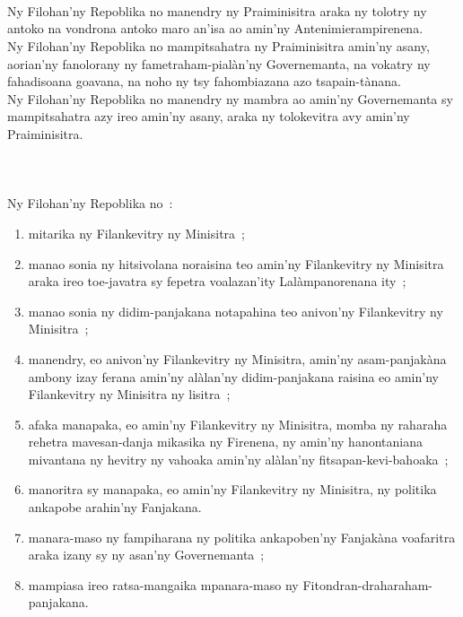 \documentclass[12pt]{article}
\newcounter{laharana}
\newcommand{\andininy}[0]{
  \paragraph{%
    \NoCaseChange{%
      Andininy~\addtocounter{laharana}{1}\thelaharana.}\label{and:\thelaharana}~%
  }%
}
\begin{document}
\andininy{}Ny Filohan'ny Repoblika no manendry ny Praiminisitra araka ny
tolotry ny antoko na vondrona antoko maro an'isa ao amin'ny
Antenimierampirenena.\\

\noindent
Ny Filohan'ny Repoblika no mampitsahatra ny Praiminisitra amin'ny asany,
aorian'ny fanolorany ny fametraham-pialàn'ny Governemanta, na vokatry ny
fahadisoana goavana, na noho ny tsy fahombiazana azo tsapain-tànana.\\

\noindent
Ny Filohan'ny Repoblika no manendry ny mambra ao amin'ny Governemanta sy
mampitsahatra azy ireo amin'ny asany, araka ny tolokevitra avy amin'ny
Praiminisitra.

\andininy{}Ny Filohan'ny Repoblika no~:

\begin{enumerate}
\item mitarika ny Filankevitry ny Minisitra~;

\item manao sonia ny hitsivolana noraisina teo amin'ny Filankevitry ny Minisitra
  araka ireo toe-javatra sy fepetra voalazan'ity Lalàmpanorenana ity~;

\item manao sonia ny didim-panjakana notapahina teo anivon'ny Filankevitry ny
  Minisitra~;

\item manendry, eo anivon'ny Filankevitry ny Minisitra, amin'ny asam-panjakàna
  ambony izay ferana amin'ny alàlan'ny didim-panjakana raisina eo amin'ny
  Filankevitry ny Minisitra ny lisitra~;

\item afaka manapaka, eo amin'ny Filankevitry ny Minisitra, momba ny raharaha
  rehetra mavesan-danja mikasika ny Firenena, ny amin'ny hanontaniana mivantana
  ny hevitry ny vahoaka amin'ny alàlan'ny fitsapan-kevi-bahoaka~;

\item manoritra sy manapaka, eo amin'ny Filankevitry ny Minisitra, ny politika
  ankapobe arahin'ny Fanjakana.

\item manara-maso ny fampiharana ny politika ankapoben'ny Fanjakàna voafaritra
  araka izany sy ny asan'ny Governemanta~;

\item mampiasa ireo ratsa-mangaika mpanara-maso ny
  Fitondran-draharaham-panjakana.
\end{enumerate}
\end{document}
